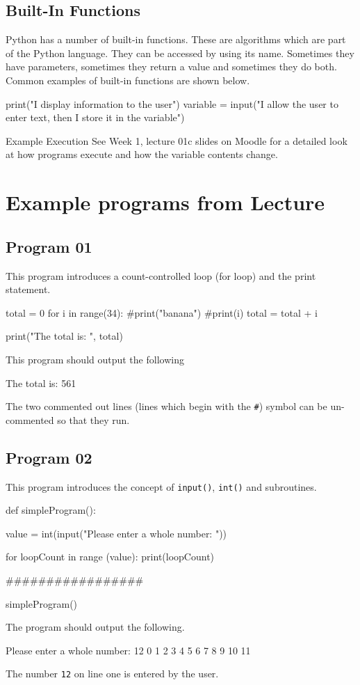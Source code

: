 \subsection*{Built-In Functions}
Python has a number of built-in functions. These are algorithms which are part of the Python language. They can be accessed by using its name. Sometimes they have parameters, sometimes they return a value and sometimes they do both. Common examples of built-in functions are shown below.
\begin{python}
print("I display information to the user")
variable = input("I allow the user to enter text, then I store it in the variable")
\end{python}

\begin{link} {Example Execution}
See Week 1, lecture 01c slides on Moodle for a detailed look at how programs execute and how the variable contents change. 
\end{link}

\section*{Example programs from Lecture}
\subsection*{Program 01}
This program introduces a count-controlled loop (for loop) and the print statement.
\begin{python}
total = 0
for i in range(34):
    #print("banana")
    #print(i)
    total = total + i

print("The total is: ", total)
\end{python}
This program should output the following
\begin{pseudo*}
The total is:  561
\end{pseudo*}
The two commented out lines (lines which begin with the \verb|#|) symbol can be un-commented so that they run.
\subsection*{Program 02}
This program introduces the concept of \verb|input()|, \verb|int()| and subroutines.
\begin{python}
def simpleProgram():
    
    value = int(input("Please enter a whole number: "))

    for loopCount in range (value):
        print(loopCount)

#################

simpleProgram()
\end{python}
The program should output the following.
\begin{pseudo*}
Please enter a whole number: 12
0
1
2
3
4
5
6
7
8
9
10
11
\end{pseudo*}
The number \verb|12| on line one is entered by the user.